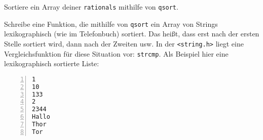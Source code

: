 \documentclass{uebungszettel}
\begin{document}
% 
% 
% 

\begin{aufg} 
Sortiere ein Array deiner \verb|rationals| mithilfe von \verb|qsort|.
\end{aufg}

\begin{aufg} Schreibe eine Funktion, die mithilfe von \verb|qsort| ein Array von Strings lexikographisch (wie im 
Telefonbuch) sortiert. Das heißt, dass erst nach der ersten Stelle sortiert wird, dann nach der Zweiten usw. In der 
\verb|<string.h>| liegt eine Vergleichsfunktion für diese Situation vor: \verb|strcmp|. Als Beispiel hier eine 
lexikographisch sortierte Liste:
\begin{codelisting}
\begin{lstlisting}[numbers=left,numberstyle=\tiny,frame=tlrb]
1
10
133
2
2344
Hallo
Thor
Tor
\end{lstlisting}
\end{codelisting}
\end{aufg}
\end{document}
